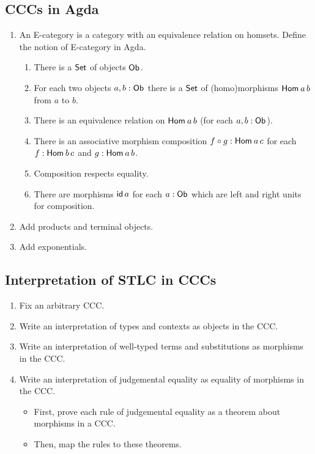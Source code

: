 \documentclass[a4paper,fleqn]{scrartcl}
\begin{document}
\subsection{CCCs in Agda}
\begin{enumerate}
\item An E-category is a category with an equivalence relation on
  homsets.  Define the notion of E-category in Agda.
  \begin{enumerate}
  \item There is a $\mathsf{Set}$ of objects $\mathsf{Ob}_{}$.
  \item For each two objects $a,b : \mathsf{Ob}_{}$
    there is a $\mathsf{Set}$ of (homo)morphisms $\mathsf{Hom}_{}\,a\,b$ from $a$ to $b$.
  \item There is an equivalence relation on $\mathsf{Hom}_{}\,a\,b$ (for each
    $a,b : \mathsf{Ob}_{}$).
  \item There is an associative morphism composition $f \circ g : \mathsf{Hom}_{}\,a\,c$ for each
    $f : \mathsf{Hom}_{}\,b\,c$ and $g : \mathsf{Hom}_{}\,a\,b$.
  \item Composition respects equality.
  \item There are morphisms $\mathsf{id}\,a$ for each $a : \mathsf{Ob}_{}$ which are
    left and right units for composition.
  \end{enumerate}
\item Add products and terminal objects.
\item Add exponentials.
\end{enumerate}

\subsection{Interpretation of STLC in CCCs}
\begin{enumerate}
\item Fix an arbitrary CCC.
\item Write an interpretation of types and contexts as objects in the CCC.
\item Write an interpretation of well-typed terms and substitutions as
  morphisms in the CCC.
\item Write an interpretation of judgemental equality as equality of
  morphisms in the CCC.
  \begin{itemize}
  \item First, prove each rule of judgemental equality as a theorem
    about morphisms in a CCC.
  \item Then, map the rules to these theorems.
  \end{itemize}
\end{enumerate}

\clearpage

\printbibliography
\end{document}
